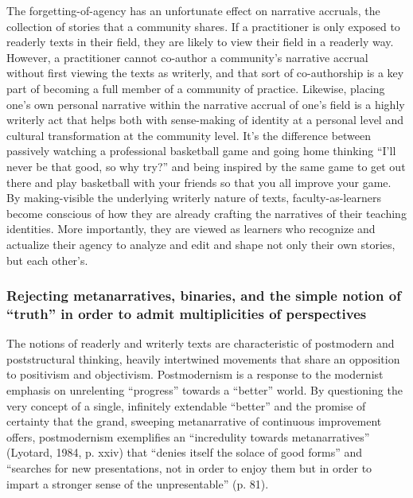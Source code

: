 The forgetting-of-agency has an unfortunate effect on narrative accruals, the collection of stories that a community shares. If a practitioner is only exposed to readerly texts in their field, they are likely to view their field in a readerly way. However, a practitioner cannot co-author a community’s narrative accrual without first viewing the texts as writerly, and that sort of co-authorship is a key part of becoming a full member of a community of practice. Likewise, placing one’s own personal narrative within the narrative accrual of one’s field is a highly writerly act that helps both with sense-making of identity at a personal level and cultural transformation at the community level. It’s the difference between passively watching a professional basketball game and going home thinking “I’ll never be that good, so why try?” and being inspired by the same game to get out there and play basketball with your friends so that you all improve your game. By making-visible the underlying writerly nature of texts, faculty-as-learners become conscious of how they are already crafting the narratives of their teaching identities. More importantly, they are viewed as learners who recognize and actualize their agency to analyze and edit and shape not only their own stories, but each other’s.

\subsubsection{Rejecting metanarratives, binaries, and the simple notion of “truth” in order to admit multiplicities of perspectives}

The notions of readerly and writerly texts are characteristic of postmodern and poststructural thinking, heavily intertwined movements that share an opposition to positivism and objectivism. Postmodernism is a response to the modernist emphasis on unrelenting “progress” towards a “better” world. By questioning the very concept of a single, infinitely extendable “better” and the promise of certainty that the grand, sweeping metanarrative of continuous improvement offers, postmodernism exemplifies an “incredulity towards metanarratives” (Lyotard, 1984, p. xxiv) that “denies itself the solace of good forms” and “searches for new presentations, not in order to enjoy them but in order to impart a stronger sense of the unpresentable” (p. 81).

